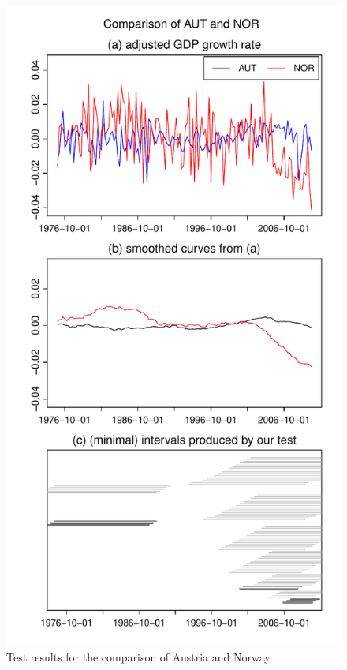 \documentclass[a4paper,12pt]{article}
\begin{document}
\begin{figure}[b!]
\begin{minipage}[t]{0.49\textwidth}
\includegraphics[width=\textwidth]{Plots/AUT_vs_NOR}
\caption{Test results for the comparison of Austria and Norway.}\label{fig:Austria:Norway}
\end{minipage}
\hspace{0.25cm}

\end{figure}
\end{document}

